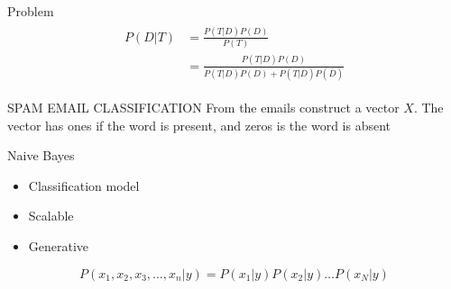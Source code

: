 \documentclass{beamer}
\begin{document}
\begin{frame}{Problem}
    \begin{align}
    \label{eqn*:eqlabel}
        \begin{split}
            P(D|T) &= \frac{P(T|D)P(D)}{P(T)}\\
            &=\frac{P(T|D)P(D)}{P(T|D)P(D) + P(T|\bar{D})P(\bar{D})}
        \end{split}
    \end{align}


    
            
            
            
            
    

            
            
            
\end{frame}

\begin{frame}{SPAM EMAIL CLASSIFICATION}
    From the emails construct a vector $X$. The vector has ones if the word is present, and zeros is the word is absent\\
\end{frame}

\begin{frame}{Naive Bayes}
    \begin{itemize}
        \item Classification model
        \item Scalable
        \item Generative
    \end{itemize}
    
    \begin{equation*}
        P(x_{1},x_{2},x_{3},\dots,x_{n} \vert y) = P(x_{1}|y) P(x_{2}|y) \dots P(x_{N}|y)
    \end{equation*}
\end{frame}
\end{document}
